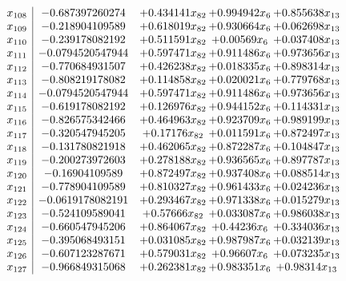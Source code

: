 \documentclass[11pt]{article}
\begin{document}
\[\begin{array}{c| c c@{\hskip 2pt} c@{\hskip 2pt} c@{\hskip 2pt} }
 x_{108}   &  -0.687397260274 & + 0.434141 x_{82} & + 0.994942 x_{6} & + 0.855638 x_{13}\\
 x_{109}   &  -0.218904109589 & + 0.618019 x_{82} & + 0.930664 x_{6} & + 0.062698 x_{13}\\
 x_{110}   &  -0.239178082192 & + 0.511591 x_{82} & + 0.00569 x_{6} & + 0.037408 x_{13}\\
 x_{111}   &  -0.0794520547944 & + 0.597471 x_{82} & + 0.911486 x_{6} & + 0.973656 x_{13}\\
 x_{112}   &  -0.770684931507 & + 0.426238 x_{82} & + 0.018335 x_{6} & + 0.898314 x_{13}\\
 x_{113}   &  -0.808219178082 & + 0.114858 x_{82} & + 0.020021 x_{6} & + 0.779768 x_{13}\\
 x_{114}   &  -0.0794520547944 & + 0.597471 x_{82} & + 0.911486 x_{6} & + 0.973656 x_{13}\\
 x_{115}   &  -0.619178082192 & + 0.126976 x_{82} & + 0.944152 x_{6} & + 0.114331 x_{13}\\
 x_{116}   &  -0.826575342466 & + 0.464963 x_{82} & + 0.923709 x_{6} & + 0.989199 x_{13}\\
 x_{117}   &  -0.320547945205 & + 0.17176 x_{82} & + 0.011591 x_{6} & + 0.872497 x_{13}\\
 x_{118}   &  -0.131780821918 & + 0.462065 x_{82} & + 0.872287 x_{6} & + 0.104847 x_{13}\\
 x_{119}   &  -0.200273972603 & + 0.278188 x_{82} & + 0.936565 x_{6} & + 0.897787 x_{13}\\
 x_{120}   &  -0.16904109589 & + 0.872497 x_{82} & + 0.937408 x_{6} & + 0.088514 x_{13}\\
 x_{121}   &  -0.778904109589 & + 0.810327 x_{82} & + 0.961433 x_{6} & + 0.024236 x_{13}\\
 x_{122}   &  -0.0619178082191 & + 0.293467 x_{82} & + 0.971338 x_{6} & + 0.015279 x_{13}\\
 x_{123}   &  -0.524109589041 & + 0.57666 x_{82} & + 0.033087 x_{6} & + 0.986038 x_{13}\\
 x_{124}   &  -0.660547945206 & + 0.864067 x_{82} & + 0.44236 x_{6} & + 0.334036 x_{13}\\
 x_{125}   &  -0.395068493151 & + 0.031085 x_{82} & + 0.987987 x_{6} & + 0.032139 x_{13}\\
 x_{126}   &  -0.607123287671 & + 0.579031 x_{82} & + 0.96607 x_{6} & + 0.073235 x_{13}\\
 x_{127}   &  -0.966849315068 & + 0.262381 x_{82} & + 0.983351 x_{6} & + 0.98314 x_{13}\\

\end{array}\]
\end{document}
